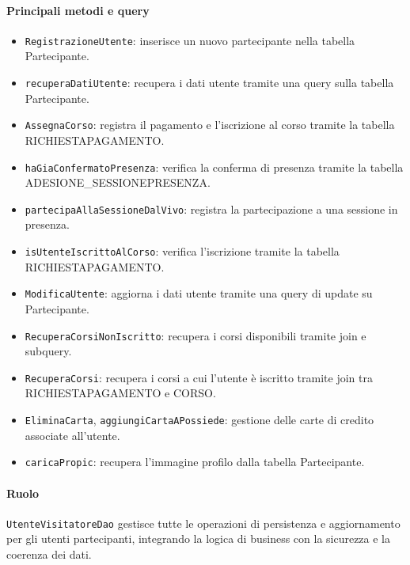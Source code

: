 \paragraph{Principali metodi e query}
\begin{itemize}
    \item \texttt{RegistrazioneUtente}: inserisce un nuovo partecipante nella tabella Partecipante.
    \item \texttt{recuperaDatiUtente}: recupera i dati utente tramite una query sulla tabella Partecipante.
    \item \texttt{AssegnaCorso}: registra il pagamento e l'iscrizione al corso tramite la tabella RICHIESTAPAGAMENTO.
    \item \texttt{haGiaConfermatoPresenza}: verifica la conferma di presenza tramite la tabella ADESIONE\_SESSIONEPRESENZA.
    \item \texttt{partecipaAllaSessioneDalVivo}: registra la partecipazione a una sessione in presenza.
    \item \texttt{isUtenteIscrittoAlCorso}: verifica l'iscrizione tramite la tabella RICHIESTAPAGAMENTO.
    \item \texttt{ModificaUtente}: aggiorna i dati utente tramite una query di update su Partecipante.
    \item \texttt{RecuperaCorsiNonIscritto}: recupera i corsi disponibili tramite join e subquery.
    \item \texttt{RecuperaCorsi}: recupera i corsi a cui l'utente è iscritto tramite join tra RICHIESTAPAGAMENTO e CORSO.
    \item \texttt{EliminaCarta}, \texttt{aggiungiCartaAPossiede}: gestione delle carte di credito associate all'utente.
    \item \texttt{caricaPropic}: recupera l'immagine profilo dalla tabella Partecipante.
\end{itemize}

\paragraph{Ruolo}
\texttt{UtenteVisitatoreDao} gestisce tutte le operazioni di persistenza e aggiornamento per gli utenti partecipanti, integrando la logica di business con la sicurezza e la coerenza dei dati.

